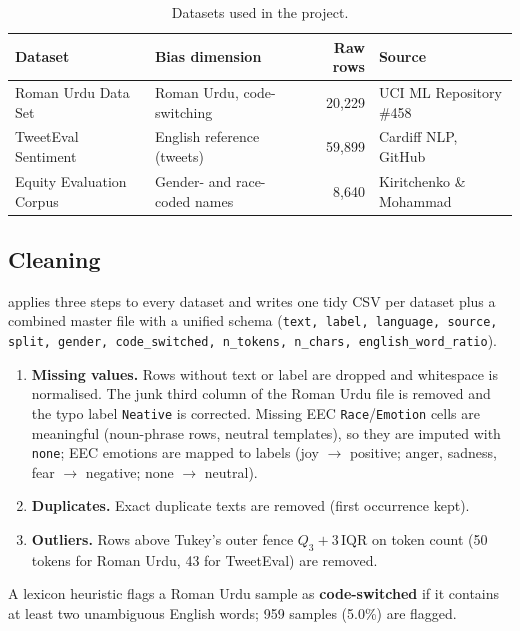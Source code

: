 \documentclass[11pt,a4paper]{article}
\begin{document}
\begin{table}[H]
\centering
\footnotesize
\begin{tabular}{llrl}
\toprule
\textbf{Dataset} & \textbf{Bias dimension} & \textbf{Raw rows} & \textbf{Source} \\
\midrule
Roman Urdu Data Set~\cite{uci} & Roman Urdu, code-switching & 20,229 & UCI ML Repository \#458 \\
TweetEval Sentiment~\cite{tweeteval} & English reference (tweets) & 59,899 & Cardiff NLP, GitHub \\
Equity Evaluation Corpus~\cite{eec} & Gender- and race-coded names & 8,640 & Kiritchenko \& Mohammad \\
\bottomrule
\end{tabular}
\caption{Datasets used in the project.}
\label{tab:datasets}
\end{table}

\subsection{Cleaning}
 applies three steps to every dataset and writes one tidy CSV
per dataset plus a combined master file with a unified schema (\texttt{text, label, language,
source, split, gender, code\_switched, n\_tokens, n\_chars, english\_word\_ratio}).
\begin{enumerate}
  \item \textbf{Missing values.} Rows without text or label are dropped and whitespace is
        normalised. The junk third column of the Roman Urdu file is removed and the typo label
        \texttt{Neative} is corrected. Missing EEC \texttt{Race}/\texttt{Emotion} cells are
        meaningful (noun-phrase rows, neutral templates), so they are imputed with
        \texttt{none}; EEC emotions are mapped to labels (joy $\to$ positive; anger, sadness,
        fear $\to$ negative; none $\to$ neutral).
  \item \textbf{Duplicates.} Exact duplicate texts are removed (first occurrence kept).
  \item \textbf{Outliers.} Rows above Tukey's outer fence $Q_3 + 3\,\mathrm{IQR}$ on token
        count (50 tokens for Roman Urdu, 43 for TweetEval) are removed.
\end{enumerate}
A lexicon heuristic flags a Roman Urdu sample as \textbf{code-switched} if it contains at least
two unambiguous English words; 959 samples (5.0\%) are flagged.
\end{document}
